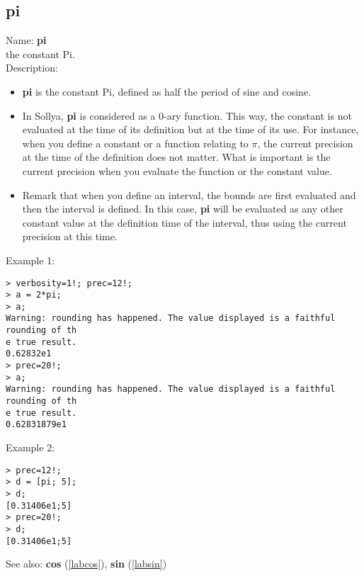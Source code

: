 \subsection{pi}
\label{labpi}
\noindent Name: \textbf{pi}\\
the constant Pi.\\

\noindent Description: \begin{itemize}

\item \textbf{pi} is the constant Pi, defined as half the period of sine and cosine.

\item In Sollya, \textbf{pi} is considered as a 0-ary function. This way, the constant 
   is not evaluated at the time of its definition but at the time of its use. For 
   instance, when you define a constant or a function relating to $\pi$, the current
   precision at the time of the definition does not matter. What is important is 
   the current precision when you evaluate the function or the constant value.

\item Remark that when you define an interval, the bounds are first evaluated and 
   then the interval is defined. In this case, \textbf{pi} will be evaluated as any 
   other constant value at the definition time of the interval, thus using the 
   current precision at this time.
\end{itemize}
\noindent Example 1: 
\begin{center}\begin{minipage}{15cm}\begin{Verbatim}[frame=single]
> verbosity=1!; prec=12!;
> a = 2*pi;
> a;
Warning: rounding has happened. The value displayed is a faithful rounding of th
e true result.
0.62832e1
> prec=20!;
> a;
Warning: rounding has happened. The value displayed is a faithful rounding of th
e true result.
0.62831879e1
\end{Verbatim}
\end{minipage}\end{center}
\noindent Example 2: 
\begin{center}\begin{minipage}{15cm}\begin{Verbatim}[frame=single]
> prec=12!;
> d = [pi; 5];
> d;
[0.31406e1;5]
> prec=20!;
> d;
[0.31406e1;5]
\end{Verbatim}
\end{minipage}\end{center}
See also: \textbf{cos} (\ref{labcos}), \textbf{sin} (\ref{labsin})
